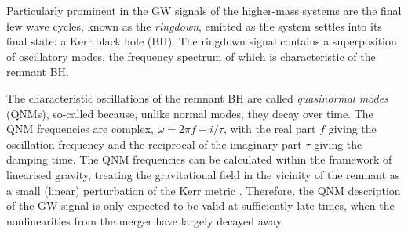
Particularly prominent in the GW signals of the higher-mass systems are the final few wave cycles, known as the \emph{ringdown}, emitted as the system settles into its final state: a Kerr black hole (BH). 
The ringdown signal contains a superposition of oscillatory modes, the frequency spectrum of which is characteristic of the remnant BH.

The characteristic oscillations of the remnant BH are called \emph{quasinormal modes} (QNMs), so-called because, unlike normal modes, they decay over time.
The QNM frequencies are complex, $\omega = 2\pi f - {i}/\tau$, with the real part $f$ giving the oscillation frequency and the reciprocal of the imaginary part $\tau$ giving the damping time. 
The QNM frequencies can be calculated within the framework of linearised gravity, treating the gravitational field in the vicinity of the remnant as a small (linear) perturbation of the Kerr metric \cite{Berti:2009kk}.
Therefore, the QNM description of the GW signal is only expected to be valid at sufficiently late times, when the nonlinearities from the merger have largely decayed away. 

